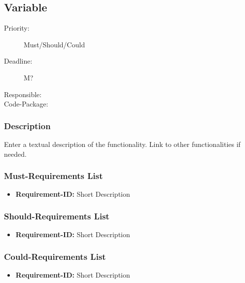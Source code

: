 \subsection{Variable}
\label{Functionality:ID}

\begin{description}
\item[Priority:] Must/Should/Could
\item[Deadline:] M?
\item[Responsible:]
\item[Code-Package:]
\end{description}

\subsubsection*{Description}

Enter a textual description of the functionality. Link to other functionalities if needed. 


\subsubsection*{Must-Requirements List}

\begin{itemize}
\item \textbf{Requirement-ID:} Short Description
\end{itemize}

\subsubsection*{Should-Requirements List}

\begin{itemize}
\item \textbf{Requirement-ID:} Short Description
\end{itemize}

\subsubsection*{Could-Requirements List}

\begin{itemize}
\item \textbf{Requirement-ID:} Short Description
\end{itemize}

